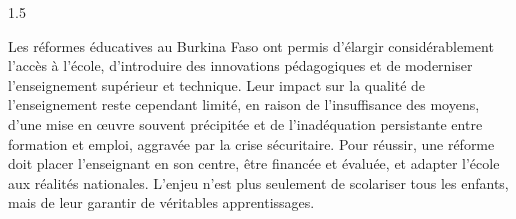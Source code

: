 \documentclass[12pt]{article}
\begin{document}
\begin{spacing}{1.5}

Les réformes éducatives au Burkina Faso ont permis d'élargir considérablement l'accès à l'école, d'introduire des innovations pédagogiques et de moderniser l'enseignement supérieur et technique. Leur impact sur la qualité de l'enseignement reste cependant limité, en raison de l'insuffisance des moyens, d'une mise en œuvre souvent précipitée et de l'inadéquation persistante entre formation et emploi, aggravée par la crise sécuritaire. Pour réussir, une réforme doit placer l'enseignant en son centre, être financée et évaluée, et adapter l'école aux réalités nationales. L'enjeu n'est plus seulement de scolariser tous les enfants, mais de leur garantir de véritables apprentissages.

\end{spacing}
\end{document}
